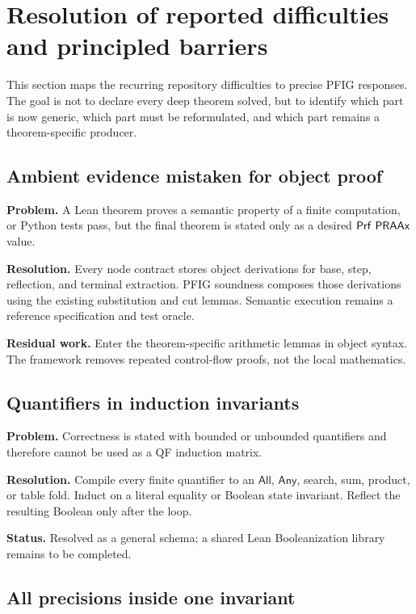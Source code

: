 \section{Resolution of reported difficulties and principled barriers}
\label{sec:difficulties}

This section maps the recurring repository difficulties to precise PFIG responses.  The goal is not to declare every deep theorem solved, but to identify which part is now generic, which part must be reformulated, and which part remains a theorem-specific producer.

\subsection{Ambient evidence mistaken for object proof}

\textbf{Problem.} A Lean theorem proves a semantic property of a finite computation, or Python tests pass, but the final theorem is stated only as a desired \(\mathsf{Prf}\ \mathsf{PRAAx}\) value.

\textbf{Resolution.} Every node contract stores object derivations for base, step, reflection, and terminal extraction.  PFIG soundness composes those derivations using the existing substitution and cut lemmas.  Semantic execution remains a reference specification and test oracle.

\textbf{Residual work.} Enter the theorem-specific arithmetic lemmas in object syntax.  The framework removes repeated control-flow proofs, not the local mathematics.

\subsection{Quantifiers in induction invariants}

\textbf{Problem.} Correctness is stated with bounded or unbounded quantifiers and therefore cannot be used as a QF induction matrix.

\textbf{Resolution.} Compile every finite quantifier to an \(\mathsf{All}\), \(\mathsf{Any}\), search, sum, product, or table fold.  Induct on a literal equality or Boolean state invariant.  Reflect the resulting Boolean only after the loop.

\textbf{Status.} Resolved as a general schema; a shared Lean Booleanization library remains to be completed.

\subsection{All precisions inside one invariant}

